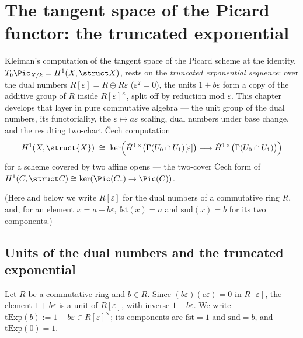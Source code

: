 \chapter{The tangent space of the Picard functor: the truncated exponential}
\label{chap:Tangent}

Kleiman's computation of the tangent space of the Picard scheme at the identity,
\(T_0 \Pic_{X/k} = H^1(X, \struct X)\), rests on the
\emph{truncated exponential sequence}: over the dual numbers
\(R[\varepsilon] = R \oplus R\varepsilon\) (\(\varepsilon^2 = 0\)), the units
\(1 + b\varepsilon\) form a copy of the additive group of \(R\) inside
\(R[\varepsilon]^\times\), split off by reduction mod \(\varepsilon\). This chapter
develops that layer in pure commutative algebra --- the unit group of the dual numbers,
its functoriality, the \(\varepsilon \mapsto a\varepsilon\) scaling, dual numbers under
base change, and the resulting two-chart \v{C}ech computation
\[
  H^1(X, \struct{X}) \;\cong\;
    \ker\Bigl( \check{H}^1{}^\times\bigl(\Gamma(U_0 \cap U_1)[\varepsilon]\bigr)
      \longrightarrow \check{H}^1{}^\times\bigl(\Gamma(U_0 \cap U_1)\bigr) \Bigr)
\]
for a scheme covered by two affine opens --- the two-cover \v{C}ech form of
\(H^1(C, \struct C) \cong \ker(\Pic(C_\varepsilon) \to \Pic(C))\).

(Here and below we write \(R[\varepsilon]\) for the dual numbers of a commutative ring
\(R\), and, for an element \(x = a + b\varepsilon\), \(\mathrm{fst}(x) = a\) and
\(\mathrm{snd}(x) = b\) for its two components.)

\section{Units of the dual numbers and the truncated exponential}

\begin{definition}
  \label{def:truncExpUnit}
  \leanok
  Let \(R\) be a commutative ring and \(b \in R\). Since
  \((b\varepsilon)(c\varepsilon) = 0\) in \(R[\varepsilon]\), the element
  \(1 + b\varepsilon\) is a unit of \(R[\varepsilon]\), with inverse
  \(1 - b\varepsilon\). We write
  \(\mathrm{tExp}(b) := 1 + b\varepsilon \in R[\varepsilon]^\times\); its components are
  \(\mathrm{fst} = 1\) and \(\mathrm{snd} = b\), and \(\mathrm{tExp}(0) = 1\).
\end{definition}

